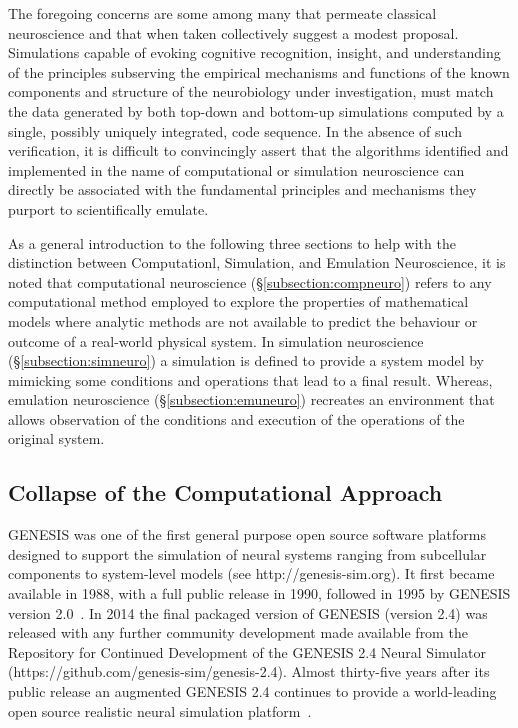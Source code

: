 \documentclass[11pt,3p,twocolumn]{JMN}
\begin{document}
The foregoing concerns are some among many that permeate classical neuroscience and that when taken collectively suggest a modest proposal. Simulations capable of evoking cognitive recognition, insight, and understanding of the principles subserving the empirical mechanisms and functions of the known components and structure of the neurobiology under investigation, must match the data generated by both top-down and bottom-up simulations computed by a single, possibly uniquely integrated, code sequence. In the absence of such verification, it is difficult to convincingly assert that the algorithms identified and implemented in the name of computational or simulation neuroscience can directly be associated with the fundamental principles and mechanisms they purport to scientifically emulate.

As a general introduction to the following three sections to help with the distinction between Computationl, Simulation, and Emulation Neuroscience, it is noted that computational neuroscience (\S\ref{subsection:compneuro}) refers to any computational method employed to explore the properties of mathematical models where analytic methods are not available to predict the behaviour or outcome of a real-world physical system. In simulation neuroscience (\S\ref{subsection:simneuro}) a simulation is defined to provide a system model by mimicking some conditions and operations that lead to a final result. Whereas, emulation neuroscience (\S\ref{subsection:emuneuro}) recreates an environment that allows observation of the conditions and execution of the operations of the original system.

\subsection{Collapse of the Computational Approach}

GENESIS was one of the first general purpose open source software platforms designed to support the simulation of neural systems ranging from subcellular components to system-level models (see http://genesis-sim.org). It first became available in 1988, with a full public release in 1990, followed in 1995 by GENESIS version 2.0~\citep{jung22}. In 2014 the final packaged version of GENESIS (version 2.4) was released with any further community development made available from the Repository for Continued Development of the GENESIS 2.4 Neural Simulator (https://github.com/genesis-sim/genesis-2.4). Almost thirty-five years after its public release an augmented GENESIS 2.4 continues to provide a world-leading open source realistic neural simulation platform~\citep[see Table\,1 in][]{tikidji-hamburyan17}.
\end{document}
